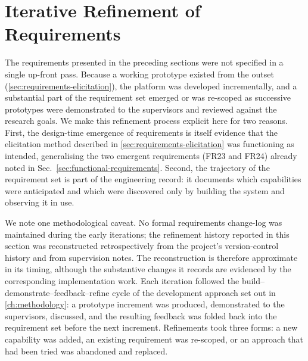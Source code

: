 \section{Iterative Refinement of Requirements}
\label{sec:requirements-evolution}

The requirements presented in the preceding sections were not specified in a single up-front pass.
Because a working prototype existed from the outset (\cref{sec:requirements-elicitation}), the platform was developed incrementally, and a substantial part of the requirement set emerged or was re-scoped as successive prototypes were demonstrated to the supervisors and reviewed against the research goals.
We make this refinement process explicit here for two reasons.
First, the design-time emergence of requirements is itself evidence that the elicitation method described in \cref{sec:requirements-elicitation} was functioning as intended, generalising the two emergent requirements (FR23 and FR24) already noted in Sec.~\ref{sec:functional-requirements}.
Second, the trajectory of the requirement set is part of the engineering record: it documents which capabilities were anticipated and which were discovered only by building the system and observing it in use.

We note one methodological caveat.
No formal requirements change-log was maintained during the early iterations; the refinement history reported in this section was reconstructed retrospectively from the project's version-control history and from supervision notes.
The reconstruction is therefore approximate in its timing, although the substantive changes it records are evidenced by the corresponding implementation work.
Each iteration followed the build--demonstrate--feedback--refine cycle of the development approach set out in \cref{ch:methodology}: a prototype increment was produced, demonstrated to the supervisors, discussed, and the resulting feedback was folded back into the requirement set before the next increment.
Refinements took three forms: a new capability was added, an existing requirement was re-scoped, or an approach that had been tried was abandoned and replaced.


